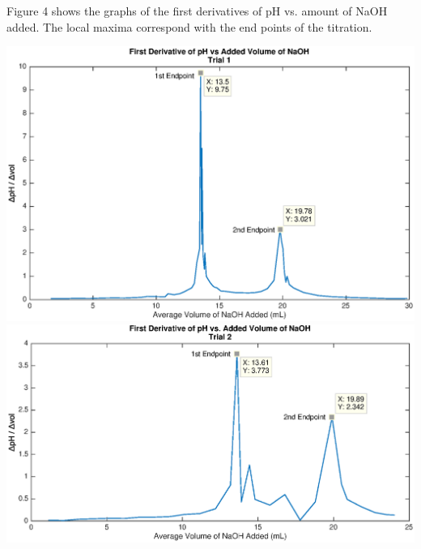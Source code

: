 \documentclass{article}
\begin{document}
Figure 4 shows the graphs of the first derivatives of pH vs. amount of NaOH
added. The local maxima correspond with the end points of the titration.
\begin{center}
        \includegraphics[scale=0.7]{1dev_1}
        \includegraphics[scale=0.7]{1dev_2}
\end{center}
\newpage
\end{document}
